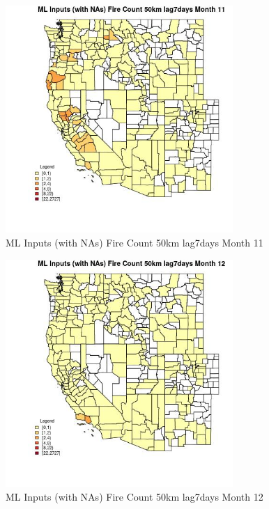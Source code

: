 \begin{figure} 
\centering  
\includegraphics[width=0.77\textwidth]{Code_Outputs/Report_ML_input_PM25_Step4_part_f_de_duplicated_aveswNAs_CountyFire_Count_50km_lag7daysmedianMonth11.jpg} 
\caption{\label{fig:Report_ML_input_PM25_Step4_part_f_de_duplicated_aveswNAsCountyFire_Count_50km_lag7daysmedianMonth11}ML Inputs (with NAs) Fire Count 50km lag7days Month 11} 
\end{figure} 
 

\begin{figure} 
\centering  
\includegraphics[width=0.77\textwidth]{Code_Outputs/Report_ML_input_PM25_Step4_part_f_de_duplicated_aveswNAs_CountyFire_Count_50km_lag7daysmedianMonth12.jpg} 
\caption{\label{fig:Report_ML_input_PM25_Step4_part_f_de_duplicated_aveswNAsCountyFire_Count_50km_lag7daysmedianMonth12}ML Inputs (with NAs) Fire Count 50km lag7days Month 12} 
\end{figure} 
 

